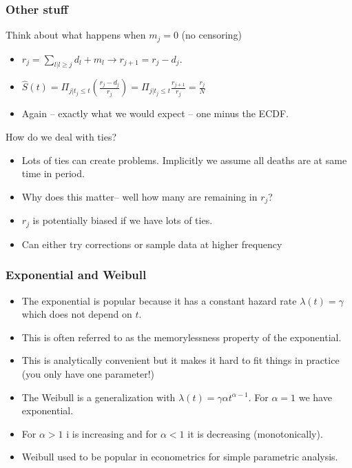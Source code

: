 \documentclass[aspectratio=169]{beamer}
\begin{document}
\begin{frame}
\frametitle{Other stuff}
Think about what happens when $m_j= 0$ (no censoring)
\begin{itemize}
\item $r_j=\sum_{l | l \geq j} d_l + m_l \rightarrow r_{j+1} = r_j - d_j$.
\item $ \hat{S}(t)= \Pi_{j|t_j \leq t} \left( \frac{r_j- d_j}{r_j} \right) =  \Pi_{j|t_j \leq t} \frac{r_{j+1}}{r_j} = \frac{r_j}{N}$
\item Again -- exactly what we would expect -- one minus the ECDF.
\end{itemize}
How do we deal with ties?
\begin{itemize}
\item Lots of ties can create problems. Implicitly we assume all deaths are at same time in period.
\item Why does this matter-- well how many are remaining in $r_j$?
\item $r_j$ is potentially biased if we have lots of ties.
\item Can either try corrections or sample data at higher frequency
\end{itemize}
\end{frame}



\begin{frame}
\frametitle{Exponential and Weibull }
\begin{itemize}
\item The exponential is popular because it has a \alert{constant hazard rate} $\lambda(t) =\gamma$ which does not depend on $t$.
\item This is often referred to as the \alert{memorylessness} property of the exponential.
\item This is analytically convenient but it makes it hard to fit things in practice (you only have one parameter!)
\item The Weibull is a generalization with $\lambda(t) = \gamma \alpha t^{\alpha-1}$. For $\alpha=1$ we have exponential.
\item For $\alpha > 1$ i is increasing and for $\alpha < 1$ it is decreasing (monotonically). 
\item Weibull used to be popular in econometrics for simple parametric analysis.
\end{itemize}
\end{frame}
\end{document}
